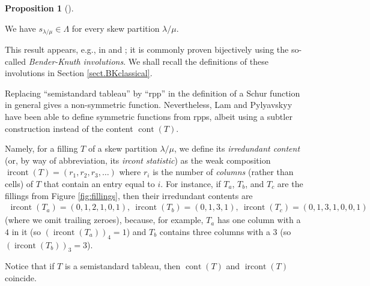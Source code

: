 \documentclass[numbers=enddot,12pt,final,onecolumn,notitlepage]{scrartcl}%
\theoremstyle{definition}
\newtheorem{prop}[theo]{Proposition}
\newenvironment{proposition}[1][]
{\begin{prop}[#1]\begin{leftbar}}
{\end{leftbar}\end{prop}}
\def\ircont{{\operatorname{ircont}}}
\def\cont{{\operatorname{cont}}}
\def\lm{{\lambda/\mu}}
\begin{document}
 
\begin{proposition}
\label{prop.schur.symm}We have $s_{\lambda/\mu}\in\Lambda$ for every skew
partition $\lambda/\mu$.
\end{proposition}

This result appears, e.g., in \cite[Theorem 7.10.2]{Stan99} and
\cite[Proposition 2.11]{GriRei15}; it is commonly proven bijectively using the
so-called \textit{Bender-Knuth involutions}. We shall recall the definitions
of these involutions in Section \ref{sect.BKclassical}.


 Replacing ``semistandard
tableau'' by ``rpp'' in the
definition of a Schur function in general gives a non-symmetric function. Nevertheless, Lam
and Pylyavskyy \cite[\S 9]{LamPyl} have been able to define
symmetric functions from rpps, albeit using a subtler construction
instead of the content $\operatorname{cont}\left(  T\right)$.



  Namely, for a filling $T$ of a skew partition $\lm$, we define its
\textit{irredundant content} (or, by way of abbreviation, its
\textit{ircont statistic})
as the weak composition $\operatorname*{ircont}\left(
T\right) = \left(r_1,r_2,r_3,\dots\right)$ where $r_i$ is the number of \emph{columns} (rather than cells) of $T$ that contain an entry equal to $i$. For instance, if $T_a$, $T_b$, and $T_c$ are the fillings from Figure \ref{fig:fillings}, then their irredundant contents are
\begin{align*}
\ircont(T_a)=(0,1,2,1,0,1),\ \ircont(T_b)=(0,1,3,1),\ \ircont(T_c)=(0,1,3,1,0,0,1)
\end{align*}
(where we omit trailing zeroes),
because, for example, $T_a$ has one column with a $4$ in it (so $(\ircont(T_a))_4=1$) and $T_b$ contains three columns with a $3$ (so $(\ircont(T_b))_3=3$).

Notice that if $T$ is a semistandard tableau, then $\cont(T)$ and $\ircont(T)$ coincide.
\end{document}
